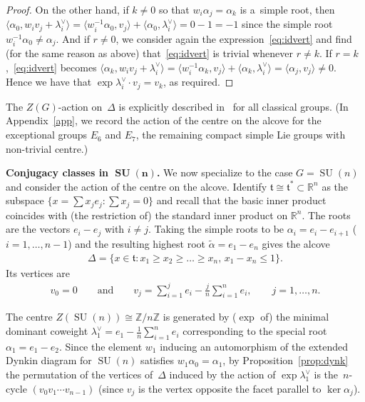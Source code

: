 \documentclass[11pt]{article}
\numberwithin{equation}{section}
\DeclareMathOperator{\SU}{SU}
\begin{document}
\begin{proof}
On the other hand, if $k\neq 0$ so that $w_i \alpha_j = \alpha_k$ is a~simple root, then $\langle \alpha_0,w_i
v_j+\lambda_i^\vee\rangle = \langle w_i^{-1} \alpha_0, v_j \rangle + \langle \alpha_0,\lambda_i^\vee\rangle = 0-1=-1$
since the simple root $w_i^{-1}\alpha_0\neq \alpha_j$.
And if $r\neq 0$, we consider again the expression~\eqref{eq:idvert} and f\/ind (for the same reason as above)
that~\eqref{eq:idvert} is trivial whenever $r\neq k$.
If $r=k$,~\eqref{eq:idvert} becomes $\langle \alpha_k,w_i v_j+ \lambda_i^\vee \rangle = \langle w_i^{-1} \alpha_k,v_j
\rangle + \langle \alpha_k,\lambda_i^\vee \rangle = \langle \alpha_j,v_j \rangle \neq 0$.
Hence we have that $\exp \lambda_i^\vee \cdot v_j = v_k$, as required.
\end{proof}

The $Z(G)$-action on~$\Delta$ is explicitly described in~\cite{TL} for all classical groups.
(In Appendix~\ref{app}, we record the action of the centre on the alcove for the exceptional groups $E_6$ and $E_7$, the
remaining compact simple Lie groups with non-trivial centre.)

{\bf Conjugacy classes in $\boldsymbol{\SU(n)}$.}
We now specialize to the case $G=\SU(n)$ and consider the action of the centre on the alcove.
Identify $\mathfrak{t}\cong \mathfrak{t}^* \subset {\mathbb{R}}^n$ as the subspace $\{x= \sum x_j e_j \colon \sum x_j =0
\}$ and recall that the basic inner product coincides with (the restriction of) the standard inner product on
${\mathbb{R}}^n$.
The roots are the vectors $e_i-e_j$ with $i\neq j$.
Taking the simple roots to be $\alpha_i=e_i-e_{i+1}$ ($i=1,\ldots,n-1$) and the resulting highest root
$\tilde{\alpha}=e_1-e_n$ gives the alcove
\begin{gather*}
\Delta = \{x \in \mathfrak{t} \colon x_1 \geq x_2 \geq \dots \geq x_n, \, x_1-x_n\leq 1 \}.
\end{gather*}
Its vertices are
\begin{gather*}
v_0=0
\qquad
\text{and}
\qquad
v_j=\sum\limits_{i=1}^{j}e_i-\frac{j}{n}\sum\limits_{i=1}^n e_i,
\qquad
j=1, \ldots, n.
\end{gather*}

The centre $Z(\SU(n))\cong {\mathbb{Z}}/n{\mathbb{Z}}$ is generated by ($\exp$ of) the minimal dominant coweight
$\lambda_1^\vee = e_1 -\frac{1}{n}\sum\limits_{i=1}^n e_i$ corresponding to the special root $\alpha_1=e_1-e_2$.
Since the element $w_1$ inducing an automorphism of the extended Dynkin diagram for $\SU(n)$ satisf\/ies
$w_1\alpha_0=\alpha_1$, by Proposition~\ref{prop:dynk} the permutation of the vertices of~$\Delta$ induced by the action
of $\exp \lambda_1^\vee$ is the~$n$-cycle $(v_0   v_1  \cdots   v_{n-1})$ (since $v_j$ is the vertex opposite the
facet parallel to $\ker \alpha_j$).
\end{document}
